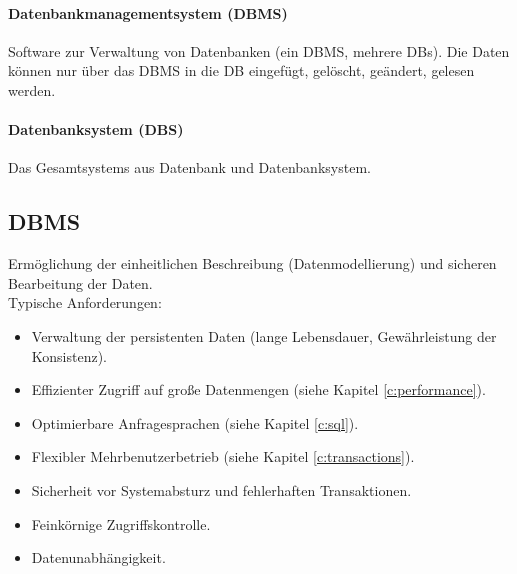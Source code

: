             \paragraph{Datenbankmanagementsystem (DBMS)}
                Software zur Verwaltung von Datenbanken (ein DBMS, mehrere DBs). Die Daten können nur über das DBMS in die DB eingefügt, gelöscht, geändert, gelesen werden.
            
            \paragraph{Datenbanksystem (DBS)}
                Das Gesamtsystems aus Datenbank und Datenbanksystem.

        \subsection{DBMS} %
            Ermöglichung der einheitlichen Beschreibung (Datenmodellierung) und sicheren Bearbeitung der Daten. \\
            
            Typische Anforderungen:
            \begin{itemize}
            	\item Verwaltung der persistenten Daten (lange Lebensdauer, Gewährleistung der Konsistenz).
            	\item Effizienter Zugriff auf große Datenmengen (siehe Kapitel \ref{c:performance}).
            	\item Optimierbare Anfragesprachen (siehe Kapitel \ref{c:sql}).
            	\item Flexibler Mehrbenutzerbetrieb (siehe Kapitel \ref{c:transactions}).
            	\item Sicherheit vor Systemabsturz und fehlerhaften Transaktionen.
            	\item Feinkörnige Zugriffskontrolle.
            	\item Datenunabhängigkeit.
            \end{itemize}
            
